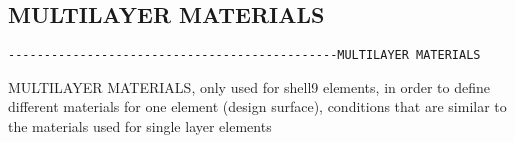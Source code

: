 \subsection{MULTILAYER MATERIALS}
\begin{verbatim}
----------------------------------------------MULTILAYER MATERIALS
\end{verbatim}

MULTILAYER MATERIALS, only used for shell9 elements, in order to define
different materials for one element (design surface),
conditions that are similar to the materials used for single layer elements

